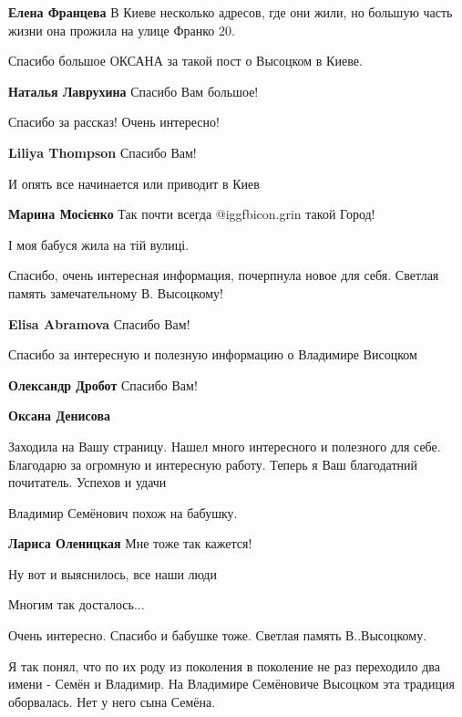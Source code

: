 \begin{itemize}
\textbf{Елена Францева} В Киеве несколько адресов, где они жили, но большую часть жизни она прожила на улице Франко 20.

Спасибо большое ОКСАНА за такой пост о Высоцком в Киеве.

\textbf{Наталья Лаврухина} Спасибо Вам большое!

Спасибо за рассказ! Очень интересно!

\textbf{Liliya Thompson} Спасибо Вам!

И опять все начинается или приводит в Киев

\textbf{Марина Мосієнко} Так почти всегда @igg{fbicon.grin}  такой Город!

І моя бабуся жила на тій вулиці.

Спасибо, очень интересная информация, почерпнула новое для себя. Светлая память
замечательному В. Высоцкому!

\textbf{Elisa Abramova} Спасибо Вам!

Спасибо за интересную и полезную информацию о Владимире Висоцком

\begin{itemize} %
\textbf{Олександр Дробот} Спасибо Вам!

\textbf{Оксана Денисова} 

Заходила на Вашу страницу. Нашел много интересного и полезного для
себе. Благодарю за огромную и интересную работу. Теперь я Ваш благодатний
почитатель. Успехов и удачи

\end{itemize} %

Владимир Семёнович похож на бабушку.

\textbf{Лариса Оленицкая} Мне тоже так кажется!

Ну вот и выяснилось, все наши люди

Многим так досталось...

Очень интересно. Спасибо и бабушке тоже. Светлая память В..Высоцкому.


Я так понял, что по их роду из поколения в поколение не раз переходило два
имени - Семён и Владимир. На Владимире Семёновиче Высоцком эта традиция
оборвалась. Нет у него сына Семёна.


\end{itemize}
